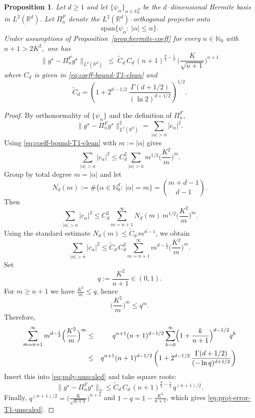 \documentclass[11pt]{article}
\newtheorem{proposition}{Proposition}[section] %
\theoremstyle{remark}
\numberwithin{equation}{section}
\newcommand{\R}{\mathbb{R}}
\newcommand{\N}{\mathbb{N}}
\begin{document}
\begin{proposition}\label{prop:proj-error-T1-unscaled}
Let $d\ge 1$ and let $\{\psi_\alpha\}_{\alpha\in\N_0^d}$ be the  $d$--dimensional Hermite basis in
$L^2(\R^d)$. Let $\Pi^F_n$ denote the $L^2(\R^d)$--orthogonal projector onto
\[
\mathrm{span}\{\psi_\alpha:\ |\alpha|\le n\}.
\]
Under assumptions of Proposition~\ref{prop:hermite-coeff}  for every $n\in\N_0$ with
\(n+1>2K^2,\)
one has
\begin{equation}\label{eq:proj-error-T1-unscaled}
\|g^\star-\Pi^F_n g^\star\|_{L^2(\R^d)}
\ \le\
\widetilde C_d\,C_d\,
(n+1)^{\frac d2-\frac14}\,
\Big(\frac{K}{\sqrt{n+1}}\Big)^{n+1}
\end{equation}
where $C_d$ is given in \eqref{eq:coeff-bound-T1-clean} and 
\[
\widetilde C_d= \left(1 + 2^{d-1/2}\,\frac{\Gamma(d+1/2)}{(\ln 2)^{d+1/2}}\right)^{1/2}.
\]
\end{proposition}

\begin{proof}
By orthonormality of $\{\psi_\alpha\}$ and the definition of $\Pi^F_n$,
\begin{equation}\label{eq:l2-tail-unscaled}
\|g^\star-\Pi^F_n g^\star\|_{L^2(\R^d)}^2
=
\sum_{|\alpha|>n}|c_\alpha|^2.
\end{equation}
Using \eqref{eq:coeff-bound-T1-clean} with $m:=|\alpha|$ gives
\[
\sum_{|\alpha|>n}|c_\alpha|^2
\le
C_d^2\sum_{|\alpha|>n} m^{1/2}\Big(\frac{K^2}{m}\Big)^m.
\]
Group by total degree $m=|\alpha|$ and let
\[
N_d(m):=\#\{\alpha\in\N_0^d:\ |\alpha|=m\}=\binom{m+d-1}{d-1}.
\]
Then
\begin{equation}\label{eq:group-unscaled}
\sum_{|\alpha|>n}|c_\alpha|^2
\le
C_d^2\sum_{m=n+1}^\infty N_d(m)\, m^{1/2}\Big(\frac{K^2}{m}\Big)^m.
\end{equation}
Using the standard estimate $N_d(m)\le \widetilde C_d\,m^{d-1}$,
we obtain
\begin{equation}\label{eq:poly-unscaled}
\sum_{|\alpha|>n}|c_\alpha|^2
\le
\widetilde C_d\,C_d^2\sum_{m=n+1}^\infty m^{d-\frac12}\Big(\frac{K^2}{m}\Big)^m.
\end{equation}
Set
\[
q:=\frac{K^2}{n+1}\in(0,1).
\]
For $m\ge n+1$ we have $\frac{K^2}{m}\le q$, hence
\[
\Big(\frac{K^2}{m}\Big)^m \le q^m.
\]
Therefore,
\begin{eqnarray*}
\sum_{m=n+1}^\infty m^{d-\frac12}\Big(\frac{K^2}{m}\Big)^m
&\le &
q^{n+1}(n+1)^{d-1/2}
\sum_{k=0}^\infty \Bigl(1+\frac{k}{n+1}\Bigr)^{d-1/2} q^k
\\
&\le & q^{n+1}(n+1)^{d-1/2}\left(1 + 2^{d-1/2}\,\frac{\Gamma(d+1/2)}{(-\ln q)^{d+1/2}}\right)
\end{eqnarray*}
Insert this into \eqref{eq:poly-unscaled} and take square roots:
\[
\|g^\star-\Pi^F_n g^\star\|_{2}
\le
\widetilde C_d\,C_d\,
(n+1)^{\frac d2-\frac14}\,q^{(n+1)/2}.
\]
Finally, $q^{(n+1)/2}=\Big(\frac{K}{\sqrt{n+1}}\Big)^{n+1}$ and $1-q=1-\frac{K^2}{n+1}$, which gives
\eqref{eq:proj-error-T1-unscaled}.
\end{proof}
\end{document}
